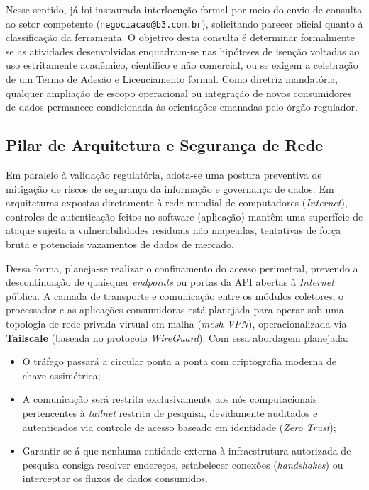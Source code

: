 Nesse sentido, já foi instaurada interlocução formal por meio do envio de consulta ao setor competente (\texttt{negociacao@b3.com.br}), solicitando parecer oficial quanto à classificação da ferramenta. O objetivo desta consulta é determinar formalmente se as atividades desenvolvidas enquadram-se nas hipóteses de isenção voltadas ao uso estritamente acadêmico, científico e não comercial, ou se exigem a celebração de um Termo de Adesão e Licenciamento formal. Como diretriz mandatória, qualquer ampliação de escopo operacional ou integração de novos consumidores de dados permanece condicionada às orientações emanadas pelo órgão regulador.

\subsection{Pilar de Arquitetura e Segurança de Rede}
Em paralelo à validação regulatória, adota-se uma postura preventiva de mitigação de riscos de segurança da informação e governança de dados. Em arquiteturas expostas diretamente à rede mundial de computadores (\textit{Internet}), controles de autenticação feitos no software (aplicação) mantêm uma superfície de ataque sujeita a vulnerabilidades residuais não mapeadas, tentativas de força bruta e potenciais vazamentos de dados de mercado.

Dessa forma, planeja-se realizar o confinamento do acesso perimetral, prevendo a descontinuação de quaisquer \textit{endpoints} ou portas da API abertas à \textit{Internet} pública. A camada de transporte e comunicação entre os módulos coletores, o processador e as aplicações consumidoras está planejada para operar sob uma topologia de rede privada virtual em malha (\textit{mesh VPN}), operacionalizada via \textbf{Tailscale} (baseada no protocolo \textit{WireGuard}). Com essa abordagem planejada:
\begin{itemize}
    \item O tráfego passará a circular ponta a ponta com criptografia moderna de chave assimétrica;
    \item A comunicação será restrita exclusivamente aos nós computacionais pertencentes à \textit{tailnet} restrita de pesquisa, devidamente auditados e autenticados via controle de acesso baseado em identidade (\textit{Zero Trust});
    \item Garantir-se-á que nenhuma entidade externa à infraestrutura autorizada de pesquisa consiga resolver endereços, estabelecer conexões (\textit{handshakes}) ou interceptar os fluxos de dados consumidos.
\end{itemize}

